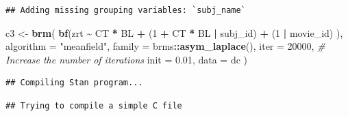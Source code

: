 \documentclass[
]{article}
\newenvironment{Shaded}{\begin{snugshade}}{\end{snugshade}}
\newcommand{\AttributeTok}[1]{\textcolor[rgb]{0.13,0.29,0.53}{#1}}
\newcommand{\CommentTok}[1]{\textcolor[rgb]{0.56,0.35,0.01}{\textit{#1}}}
\newcommand{\DecValTok}[1]{\textcolor[rgb]{0.00,0.00,0.81}{#1}}
\newcommand{\FloatTok}[1]{\textcolor[rgb]{0.00,0.00,0.81}{#1}}
\newcommand{\FunctionTok}[1]{\textcolor[rgb]{0.13,0.29,0.53}{\textbf{#1}}}
\newcommand{\NormalTok}[1]{#1}
\newcommand{\OtherTok}[1]{\textcolor[rgb]{0.56,0.35,0.01}{#1}}
\newcommand{\SpecialCharTok}[1]{\textcolor[rgb]{0.81,0.36,0.00}{\textbf{#1}}}
\newcommand{\StringTok}[1]{\textcolor[rgb]{0.31,0.60,0.02}{#1}}
\begin{document}
\begin{verbatim}
## Adding missing grouping variables: `subj_name`
\end{verbatim}

\begin{Shaded}
\begin{Highlighting}[]
\NormalTok{c3 }\OtherTok{\textless{}{-}} \FunctionTok{brm}\NormalTok{(}
  \FunctionTok{bf}\NormalTok{(zrt }\SpecialCharTok{\textasciitilde{}}\NormalTok{ CT }\SpecialCharTok{*}\NormalTok{ BL }\SpecialCharTok{+}
\NormalTok{       (}\DecValTok{1} \SpecialCharTok{+}\NormalTok{ CT }\SpecialCharTok{*}\NormalTok{ BL }\SpecialCharTok{|}\NormalTok{ subj\_id) }\SpecialCharTok{+}\NormalTok{ (}\DecValTok{1} \SpecialCharTok{|}\NormalTok{ movie\_id)}
\NormalTok{  ), }
  \AttributeTok{algorithm =} \StringTok{"meanfield"}\NormalTok{,}
  \AttributeTok{family =}\NormalTok{ brms}\SpecialCharTok{::}\FunctionTok{asym\_laplace}\NormalTok{(),}
  \AttributeTok{iter =} \DecValTok{20000}\NormalTok{, }\CommentTok{\# Increase the number of iterations}
  \AttributeTok{init =} \FloatTok{0.01}\NormalTok{,}
  \AttributeTok{data =}\NormalTok{ dc}
\NormalTok{)}
\end{Highlighting}
\end{Shaded}

\begin{verbatim}
## Compiling Stan program...
\end{verbatim}

\begin{verbatim}
## Trying to compile a simple C file
\end{verbatim}
\end{document}
